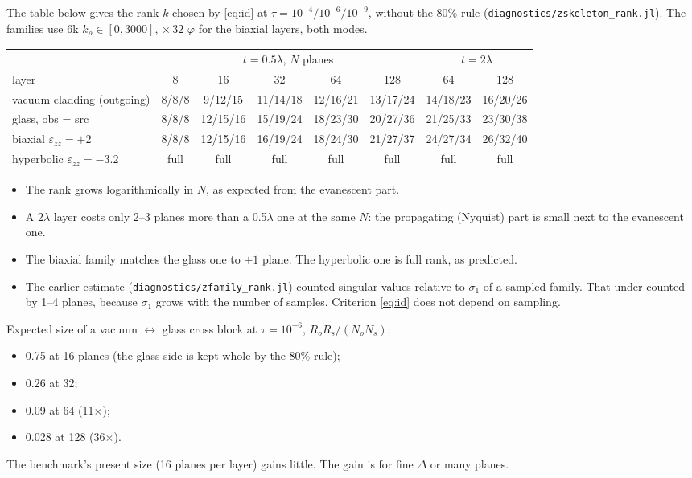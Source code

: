 \documentclass[11pt,a4paper]{article}
\newcommand{\code}[1]{\texttt{#1}}
\theoremstyle{remark}
\begin{document}
The table below gives the rank $k$ chosen by \eqref{eq:id} at $\tau = 10^{-4}/10^{-6}/10^{-9}$, without the 80\% rule
(\code{diagnostics/zskeleton\_rank.jl}). The families use 6k $k_\rho\in[0,3000]$, $\times\,32$ $\varphi$ for the biaxial layers, both modes.
\begin{center}
\footnotesize
\setlength{\tabcolsep}{4pt}
\begin{tabular}{lccccccc}
\toprule
 & \multicolumn{5}{c}{$t=0.5\lambda$, $N$ planes} & \multicolumn{2}{c}{$t=2\lambda$} \\
\cmidrule(lr){2-6}\cmidrule(lr){7-8}
layer & 8 & 16 & 32 & 64 & 128 & 64 & 128 \\
\midrule
vacuum cladding (outgoing) & 8/8/8 & 9/12/15 & 11/14/18 & 12/16/21 & 13/17/24 & 14/18/23 & 16/20/26 \\
glass, obs = src & 8/8/8 & 12/15/16 & 15/19/24 & 18/23/30 & 20/27/36 & 21/25/33 & 23/30/38 \\
biaxial $\varepsilon_{zz}=+2$ & 8/8/8 & 12/15/16 & 16/19/24 & 18/24/30 & 21/27/37 & 24/27/34 & 26/32/40 \\
hyperbolic $\varepsilon_{zz}=-3.2$ & full & full & full & full & full & full & full \\
\bottomrule
\end{tabular}
\end{center}
\begin{itemize}[leftmargin=*]
\item The rank grows logarithmically in $N$, as expected from the evanescent part.
\item A 2$\lambda$ layer costs only 2--3 planes more than a 0.5$\lambda$ one at the same $N$: the propagating (Nyquist) part is
  small next to the evanescent one.
\item The biaxial family matches the glass one to $\pm1$ plane. The hyperbolic one is full rank, as predicted.
\item The earlier estimate (\code{diagnostics/zfamily\_rank.jl}) counted singular values relative to $\sigma_1$ of a sampled family.
  That under-counted by 1--4 planes, because $\sigma_1$ grows with the number of samples. Criterion \eqref{eq:id} does not
  depend on sampling.
\end{itemize}
Expected size of a vacuum $\leftrightarrow$ glass cross block at $\tau=10^{-6}$, $R_oR_s/(N_oN_s)$:
\begin{itemize}[leftmargin=*]
\item 0.75 at 16 planes (the glass side is kept whole by the 80\% rule);
\item 0.26 at 32;
\item 0.09 at 64 (11$\times$);
\item 0.028 at 128 (36$\times$).
\end{itemize}
The benchmark's present size (16 planes per layer) gains little. The gain is for fine $\Delta$ or many planes.
\end{document}

